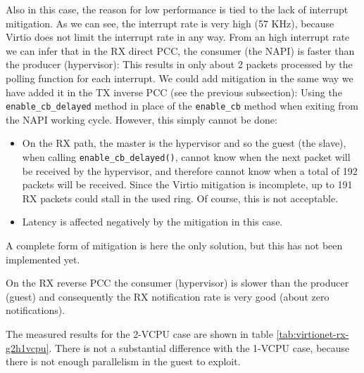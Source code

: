 Also in this case, the reason for low performance is tied to the lack of interrupt mitigation. As we can see, the interrupt rate is
very high (57 KHz), because Virtio does not limit the interrupt rate in any way. From an high interrupt rate we can infer that in the 
RX direct PCC, the consumer (the NAPI) is faster than the producer (hypervisor): This results in only about 2
packets processed by the polling function for each interrupt.
We could add mitigation in the same way we have added it in the TX inverse PCC (see the previous subsection): Using
the \texttt{enable\_cb\_delayed} method in place of the \texttt{enable\_cb} method when exiting from the NAPI working cycle.
However, this simply cannot be done:
\begin{itemize}
  \item On the RX path, the master is the hypervisor and so the guest (the slave), when calling
	\texttt{enable\_cb\_delayed()}, cannot know when the next packet will be received by the hypervisor, and therefore cannot know
	when a total of 192 packets will be received. Since the Virtio mitigation is incomplete, up to 191 RX packets could stall
	in the used ring. Of course, this is not acceptable.
  \item Latency is affected negatively by the mitigation in this case.
\end{itemize}
A complete form of mitigation is here the only solution, but this has not been implemented yet.

\vspace{0.5cm}

On the RX reverse PCC the consumer (hypervisor) is slower than the producer (guest) and consequently the RX notification rate is
very good (about zero notifications).

\vspace{0.5cm}

The measured results for the 2-VCPU case are shown in table \ref{tab:virtionet-rx-g2h1vcpu}. There is not a substantial difference with
the 1-VCPU case, because there is not enough parallelism in the guest to exploit.



